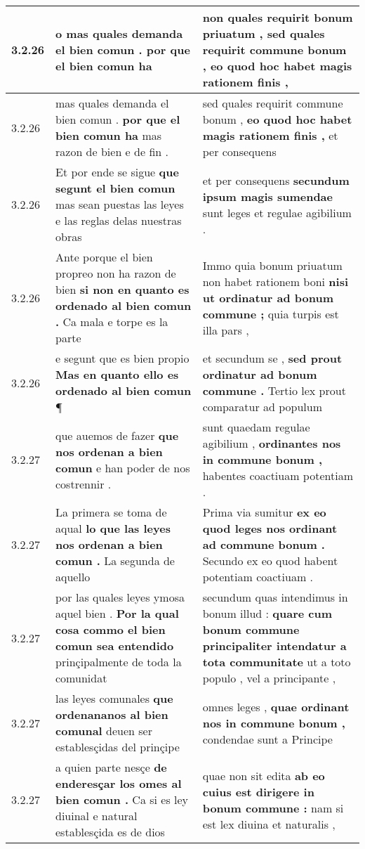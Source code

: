 \begin{tabular}{|p{1cm}|p{6.5cm}|p{6.5cm}|}
3.2.26 & o \textbf{ mas quales demanda el bien comun . } por que el bien comun ha & non quales requirit bonum priuatum , \textbf{ sed quales requirit commune bonum , } eo quod hoc habet magis rationem finis , \\\hline
3.2.26 & mas quales demanda el bien comun . \textbf{ por que el bien comun ha } mas razon de bien e de fin . & sed quales requirit commune bonum , \textbf{ eo quod hoc habet magis rationem finis , } et per consequens \\\hline
3.2.26 & Et por ende se sigue \textbf{ que segunt el bien comun } mas sean puestas las leyes e las reglas delas nuestras obras & et per consequens \textbf{ secundum ipsum magis sumendae } sunt leges et regulae agibilium . \\\hline
3.2.26 & Ante porque el bien propreo non ha razon de bien \textbf{ si non en quanto es ordenado al bien comun . } Ca mala e torpe es la parte & Immo quia bonum priuatum non habet rationem boni \textbf{ nisi ut ordinatur ad bonum commune ; } quia turpis est illa pars , \\\hline
3.2.26 & e segunt que es bien propio \textbf{ Mas en quanto ello es ordenado al bien comun } ¶ & et secundum se , \textbf{ sed prout ordinatur ad bonum commune . } Tertio lex prout comparatur ad populum \\\hline
3.2.27 & que auemos de fazer \textbf{ que nos ordenan a bien comun } e han poder de nos costrennir . & sunt quaedam regulae agibilium , \textbf{ ordinantes nos in commune bonum , } habentes coactiuam potentiam . \\\hline
3.2.27 & La primera se toma de aqual \textbf{ lo que las leyes nos ordenan a bien comun . } La segunda de aquello & Prima via sumitur \textbf{ ex eo quod leges nos ordinant ad commune bonum . } Secundo ex eo quod habent potentiam coactiuam . \\\hline
3.2.27 & por las quales leyes ymosa aquel bien . \textbf{ Por la qual cosa commo el bien comun sea entendido } prinçipalmente de toda la comunidat & secundum quas intendimus in bonum illud : \textbf{ quare cum bonum commune principaliter intendatur a tota communitate } ut a toto populo , vel a principante , \\\hline
3.2.27 & las leyes comunales \textbf{ que ordenananos al bien comunal } deuen ser establesçidas del prinçipe & omnes leges , \textbf{ quae ordinant nos in commune bonum , } condendae sunt a Principe \\\hline
3.2.27 & a quien parte nesçe \textbf{ de enderesçar los omes al bien comun . } Ca si es ley diuinal e natural establesçida es de dios & quae non sit edita \textbf{ ab eo cuius est dirigere in bonum commune : } nam si est lex diuina et naturalis , \\\hline

\end{tabular}
